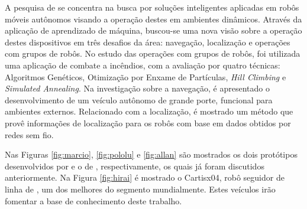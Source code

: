 A pesquisa de  se concentra na busca por soluções inteligentes aplicadas em robôs móveis autônomos visando a operação 
destes em ambientes dinâmicos. Através da aplicação de aprendizado de máquina, buscou-se uma nova visão sobre a operação destes 
dispositivos em três desafios da área: navegação, localização e operações com grupos de robôs. 
No estudo das operações com grupos de robôs, foi utilizada uma aplicação de combate a 
incêndios, com a avaliação por quatro técnicas: Algoritmos Genéticos, 
Otimização por Enxame de Partículas, \textit{Hill Climbing} e \textit{Simulated Annealing}. Na investigação sobre a navegação, é 
apresentado o desenvolvimento de um veículo autônomo de grande porte, funcional para ambientes externos. Relacionado com a localização, 
é mostrado um método que provê informações de localização para os robôs com base em dados obtidos por redes sem fio.



Nas Figuras \ref{fig:marcio}, \ref{fig:pololu} e \ref{fig:allan} são mostrados os dois protótipos desenvolvidos por  e 
o de , respectivamente, os quais já foram discutidos anteriormente. Na Figura \ref{fig:hirai} é mostrado o 
Cartisx04, robô seguidor de linha de , um dos melhores do segmento mundialmente. 
Estes veículos irão fomentar a base de conhecimento deste trabalho.


